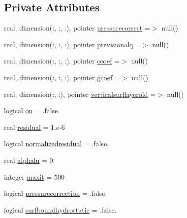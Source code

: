 \subsection*{Private Attributes}
\begin{DoxyCompactItemize}
\item 
real, dimension(\+:, \+:, \+:), pointer \mbox{\hyperlink{structmodulehydrodynamic_1_1t__nonhydrostatic_a4f7c864e4b3385ba0fac944e0ec32a67}{pressurecorrect}} =$>$ null()
\item 
real, dimension(\+:, \+:, \+:), pointer \mbox{\hyperlink{structmodulehydrodynamic_1_1t__nonhydrostatic_a5bc0ea9d8dfdeaa063b1889b852422ae}{previsionalq}} =$>$ null()
\item 
real, dimension(\+:, \+:, \+:), pointer \mbox{\hyperlink{structmodulehydrodynamic_1_1t__nonhydrostatic_a55d0964c7eb98f49a8e770842d41450b}{ccoef}} =$>$ null()
\item 
real, dimension(\+:, \+:, \+:), pointer \mbox{\hyperlink{structmodulehydrodynamic_1_1t__nonhydrostatic_ade3277ef03392df113d48c6b71645135}{gcoef}} =$>$ null()
\item 
real, dimension(\+:, \+:), pointer \mbox{\hyperlink{structmodulehydrodynamic_1_1t__nonhydrostatic_a8e708e7a8add6b6aab07e3ed26b7f2d9}{verticalsurflayerold}} =$>$ null()
\item 
logical \mbox{\hyperlink{structmodulehydrodynamic_1_1t__nonhydrostatic_a4757abd56cfd6880d88891f4e5ddb037}{on}} = .false.
\item 
real \mbox{\hyperlink{structmodulehydrodynamic_1_1t__nonhydrostatic_a679d8466644983e55bff63ae3a9ae169}{residual}} = 1.e-\/6
\item 
logical \mbox{\hyperlink{structmodulehydrodynamic_1_1t__nonhydrostatic_a93dfb53cced7e439583255299d14bfb7}{normalizedresidual}} = .false.
\item 
real \mbox{\hyperlink{structmodulehydrodynamic_1_1t__nonhydrostatic_ad617ddeb64e86b422ae20df54ca4cfee}{alphalu}} = 0.
\item 
integer \mbox{\hyperlink{structmodulehydrodynamic_1_1t__nonhydrostatic_adcfcf20ccffe835e82fda54bb9bd0dba}{maxit}} = 500
\item 
logical \mbox{\hyperlink{structmodulehydrodynamic_1_1t__nonhydrostatic_af867257c9e5eaaf37f78a0aa5d48bb89}{pressurecorrection}} = .false.
\item 
logical \mbox{\hyperlink{structmodulehydrodynamic_1_1t__nonhydrostatic_ac6a081415980e6d6d833665ae6aa5a28}{surfboundhydrostatic}} = .false.
\end{DoxyCompactItemize}


